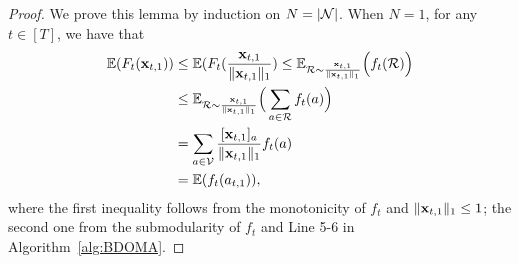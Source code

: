 \begin{proof}
	We prove this lemma by induction on $N=|\mathcal{N}|$. When $N=1$, for any $t\in[T]$, we have that
	\begin{equation}\label{equ:rounding1}
		\begin{aligned}
			\mathbb{E}(F_{t}(\mathbf{x}_{t,1}))&\le \mathbb{E}(F_{t}(\frac{\mathbf{x}_{t,1}}{\|\mathbf{x}_{t,1}\|_{1}})\le \mathbb{E}_{\mathcal{R}\sim\frac{\mathbf{x}_{t,1}}{\|\mathbf{x}_{t,1}\|_{1}}}\Big(f_{t}(\mathcal{R})\Big)\\
			&\le \mathbb{E}_{\mathcal{R}\sim\frac{\mathbf{x}_{t,1}}{\|\mathbf{x}_{t,1}\|_{1}}}\Big(\sum_{a\in\mathcal{R}}f_{t}(a)\Big)\\
			&=\sum_{a\in\mathcal{V}}\frac{[\mathbf{x}_{t,1}]_{a}}{\|\mathbf{x}_{t,1}\|_{1}}f_{t}(a)\\
			&=\mathbb{E}(f_{t}(a_{t,1})),	\end{aligned}
	\end{equation} where the first inequality follows from the monotonicity of $f_{t}$ and $\|\mathbf{x}_{t,1}\|_{1}\le1$; the second one from  the submodularity of $f_{t}$ and Line 5-6 in Algorithm~\ref{alg:BDOMA}.
	

\end{proof}
